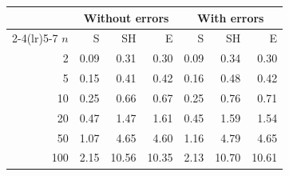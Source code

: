 \begin{tabular}{rrrrrrr}
\toprule
 & \multicolumn{3}{c}{Without errors} & \multicolumn{3}{c}{With errors} \\
\cmidrule(lr){2-4}\cmidrule(lr){5-7}
$n$ & S & SH & E & S & SH & E \\
\midrule
2 & 0.09 & 0.31 & 0.30 & 0.09 & 0.34 & 0.30 \\
5 & 0.15 & 0.41 & 0.42 & 0.16 & 0.48 & 0.42 \\
10 & 0.25 & 0.66 & 0.67 & 0.25 & 0.76 & 0.71 \\
20 & 0.47 & 1.47 & 1.61 & 0.45 & 1.59 & 1.54 \\
50 & 1.07 & 4.65 & 4.60 & 1.16 & 4.79 & 4.65 \\
100 & 2.15 & 10.56 & 10.35 & 2.13 & 10.70 & 10.61 \\
\bottomrule
\end{tabular}
